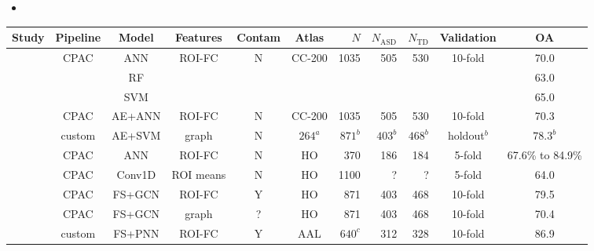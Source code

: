 \documentclass[10pt]{article}
\begin{document}
\begin{itemize}
  \item
\end{itemize}

\begin{table}
  \small
  \centering
  \begin{tabular}{lcccccrrrcc}
    \toprule
    Study                                                         & Pipeline & Model  & Features & Contam &   Atlas  & \(N\) & \(N_\text{ASD}\) & \(N_{\text{TD}}\) & Validation & OA \\
    \midrule
    \citet{heinsfeldIdentificationAutismSpectrum2018}             &   CPAC   &   ANN  &  ROI-FC  &   N    &   CC-200   & 1035  &  505  &  530  &  10-fold   &       70.0       \\
    ~                                                             &          &   RF   &          &        &            &       &       &       &            &       63.0       \\
    ~                                                             &          &   SVM  &          &        &            &       &       &       &            &       65.0       \\ \addlinespace
    \citet{eslamiASDDiagNetHybridLearning2019}                    &   CPAC   & AE+ANN &  ROI-FC  &   N    &   CC-200   & 1035  &  505  &  530  &  10-fold   &       70.3       \\
    \citet{yinDiagnosisAutismSpectrum2021}                        &  custom  & AE+SVM &  graph   &   N    & \(264^a\)  & \(871^b\) & \(403^b\) & \(468^b\)  &  holdout\(^b\) &       \(78.3^b\) \\
    \citet{liMultisiteFMRIAnalysis2020}                           &   CPAC   &  ANN   &  ROI-FC  &   N    &     HO     &  370  &  186  &  184  &   5-fold   & 67.6\% to 84.9\% \\
    \citet{el-gazzarHybrid3DCNN3DCLSTM2019}                       &   CPAC   & Conv1D & ROI means&   N    &     HO     & 1100  &   ?   &   ?   &   5-fold   &       64.0       \\
    \citet{shaoClassificationASDBased2021}                        &   CPAC   & FS+GCN &  ROI-FC  &   Y    &     HO     &  871  &  403  &  468  &  10-fold   &       79.5       \\
    \citet{parisotDiseasePredictionUsing2018}                     &   CPAC   & FS+GCN &  graph   &   ?    &     HO     &  871  &  403  &  468  &  10-fold   &       70.4       \\
    \citet{iidakaRestingStateFunctional2015}                      &  custom  & FS+PNN &  ROI-FC  &   Y    &     AAL   &\(640^c\)& 312  &  328  &  10-fold   &       86.9       \\

\end{tabular}
\end{table}
\end{document}

